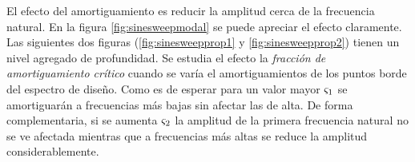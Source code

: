 \documentclass[onecolumn,10pt,titlepage,a4paper]{article}
\begin{document}
El efecto del amortiguamiento es reducir la amplitud cerca de la frecuencia natural. En la figura \ref{fig:sinesweepmodal} se puede apreciar el efecto claramente. Las siguientes dos figuras (\ref{fig:sinesweepprop1} y \ref{fig:sinesweepprop2}) tienen un nivel agregado de profundidad. Se estudia el efecto la \textit{fracción de amortiguamiento crítico} \cite{cook2007concepts} cuando se varía el amortiguamientos de los puntos borde del espectro de diseño. Como es de esperar para un valor mayor $\varsigma_1$ se amortiguarán a frecuencias más bajas sin afectar las de alta. De forma complementaria, si se aumenta $\varsigma_2$ la amplitud de la primera frecuencia natural no se ve afectada mientras que a frecuencias más altas se reduce la amplitud considerablemente.

 
\end{document}
